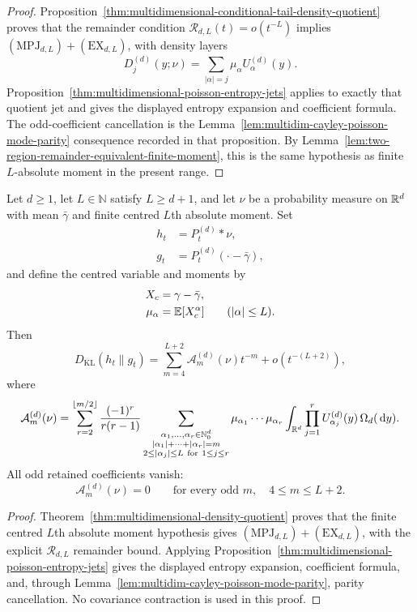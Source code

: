 \begin{proof}
Proposition~\ref{thm:multidimensional-conditional-tail-density-quotient} proves
that the remainder condition \(\mathcal R_{d,L}(t)=o(t^{-L})\) implies
\((\mathrm{MPJ}_{d,L})+(\mathrm{EX}_{d,L})\), with density layers
\[
D_j^{(d)}(y;\nu)=\sum_{|\alpha|=j}\mu_\alpha U_\alpha^{(d)}(y).
\]
Proposition~\ref{thm:multidimensional-poisson-entropy-jets} applies to
exactly that quotient jet and gives the displayed entropy expansion and
coefficient formula.  The odd-coefficient cancellation is the
Lemma~\ref{lem:multidim-cayley-poisson-mode-parity} consequence recorded in
that proposition.  By
Lemma~\ref{lem:two-region-remainder-equivalent-finite-moment}, this is the
same hypothesis as finite \(L\)-absolute moment in the present range.
\end{proof}

\begin{corollary}%
\label{thm:multidim-finite-moment-poisson-kl-asymptotic}%
\label{cor:multidim-finite-moment-entropy-jet}
Let \(d\ge1\), let \(L\in\mathbb N\) satisfy \(L\ge d+1\), and let \(\nu\) be
a probability measure on \(\mathbb{R}^d\) with mean \(\bar{\gamma}\) and finite centred
\(L\)th absolute moment.  Set
\[
\begin{aligned}
h_t&=P_t^{(d)}*\nu,\\
g_t&=P_t^{(d)}(\cdot-\bar{\gamma}),
\end{aligned}
\]
and define the centred variable and moments by
\[
\begin{aligned}
X_c&=\gamma-\bar{\gamma},\\
\mu_\alpha&=\mathbb{E}[X_c^\alpha]\qquad(|\alpha|\le L).
\end{aligned}
\]
Then
\[
D_{\mathrm{KL}}(h_t\|g_t)
=\sum_{m=4}^{L+2}\mathcal A_m^{(d)}(\nu)t^{-m}
+o(t^{-(L+2)}),
\]
where
\[
\mathcal A_m^{(d)}(\nu)=
\sum_{r=2}^{\lfloor m/2\rfloor}
\frac{(-1)^r}{r(r-1)}
\sum_{\substack{\alpha_1,\ldots,\alpha_r\in\mathbb{N}_0^d\\
|\alpha_1|+\cdots+|\alpha_r|=m\\
2\le|\alpha_j|\le L\ \mathrm{for}\ 1\le j\le r}}
\mu_{\alpha_1}\cdots\mu_{\alpha_r}
\int_{\mathbb{R}^d}\prod_{j=1}^r
U_{\alpha_j}^{(d)}(y)\,\Omega_d(\,\mathrm{d} y).
\]
All odd retained coefficients vanish:
\[
\mathcal A_m^{(d)}(\nu)=0
\qquad\text{for every odd }m,\quad 4\le m\le L+2.
\]
\end{corollary}

\begin{proof}
Theorem~\ref{thm:multidimensional-density-quotient} proves that the finite
centred \(L\)th absolute moment hypothesis gives
\((\mathrm{MPJ}_{d,L})+(\mathrm{EX}_{d,L})\), with the explicit
\(\mathcal R_{d,L}\) remainder bound.  Applying
Proposition~\ref{thm:multidimensional-poisson-entropy-jets} gives the
displayed entropy expansion, coefficient formula, and, through
Lemma~\ref{lem:multidim-cayley-poisson-mode-parity}, parity cancellation.
No covariance contraction is used in this proof.
\end{proof}

